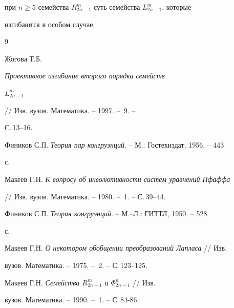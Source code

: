 при $n\ge5$ семейства $R^m_{2n-1}$ суть семейства $L^m_{2n-1}$, которые 


изгибаются в особом случае. 


 


 


 


\begin{thebibliography}{9} 


 




Жогова Т.Б. {\em Проективное изгибание второго порядка семейств 


$L^m_{2n-1}$} // Изв. вузов. Математика. -- 1997. -- \No\,9. -- 


С.\,13--16. 




Фиников С.П. {\em Теория пар конгруэнций}. -- М.: Гостехиздат, 1956. -- 443 


с. 




Макеев Г.Н. {\em К вопросу об инволютивности систем уравнений Пфаффа} 


// Изв. вузов. Математика. -- 1980. -- \No\,1. -- С.\,39--44. 




Фиников С.П. {\em Теория конгруэнций}. -- М.--Л.: ГИТТЛ, 1950. -- 528 


с. 




Макеев Г.Н. {\em О некотором обобщении преобразований Лапласа} // Изв. 


вузов. Математика. -- 1975. -- \No\,2. -- С.\,123--125.




Макеев Г.Н. {\em Семейства $R^m_{2n-1}$ и $\Phi^n_{2n-1}$} // Изв. 


вузов. Математика. -- 1990. -- \No\,1. -- С.\,84-86. 


 


\end{thebibliography} 


 


\vskip 2cm 


 








\label{end} 


 


